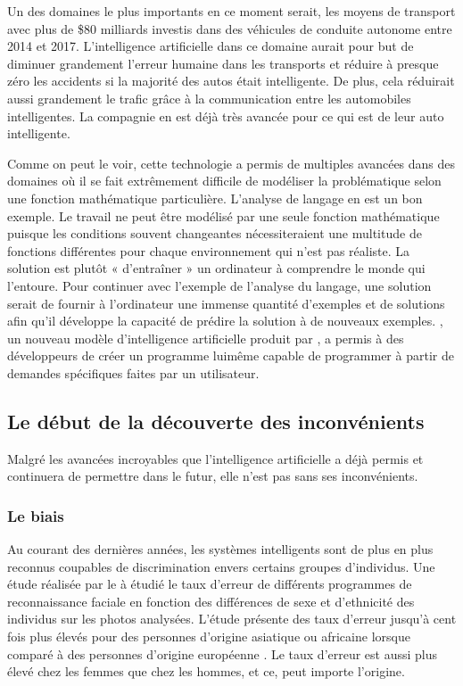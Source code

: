 \documentclass[letterpaper,10pt,french]{sphinxmanual}
\begin{document}
Un des domaines le plus importants en ce moment serait, les moyens de transport avec plus de \$80
milliards investis dans des véhicules de conduite autonome entre 2014 et 2017. L’intelligence
artificielle dans ce domaine aurait pour but de diminuer grandement l’erreur humaine dans les transports
et réduire à presque zéro les accidents si la majorité des autos était intelligente. De plus, cela réduirait
aussi grandement le trafic grâce à la communication entre les automobiles intelligentes. La compagnie 
en est déjà très avancée pour ce qui est de leur auto intelligente. 

Comme on peut le voir, cette technologie a permis de multiples avancées dans des domaines où
il se fait extrêmement difficile de modéliser la problématique selon une
fonction mathématique particulière. L’analyse de langage en est un bon exemple.
Le travail ne peut être modélisé par une seule fonction mathématique puisque
les conditions souvent changeantes nécessiteraient une multitude de fonctions
différentes pour chaque environnement qui n’est pas réaliste. La solution est
plutôt « d’entraîner » un ordinateur à comprendre le monde qui l’entoure.
Pour continuer avec l’exemple de l’analyse du langage, une solution serait
de fournir à l’ordinateur une immense quantité d’exemples et de solutions afin
qu’il développe la capacité de prédire la solution à de nouveaux exemples.
,
un nouveau modèle d’intelligence artificielle produit par
, a permis à des développeurs de créer un programme
lui\sphinxhyphen{}même capable de programmer à partir de demandes spécifiques faites par un
utilisateur.


\subsection{Le début de la découverte des inconvénients}
\label{\detokenize{intro_finale:le-debut-de-la-decouverte-des-inconvenients}}
Malgré les avancées incroyables que l’intelligence artificielle a déjà permis et
continuera de permettre dans le futur, elle n’est pas sans ses inconvénients.


\subsubsection{Le biais}
\label{\detokenize{intro_finale:le-biais}}
Au
courant des dernières années, les systèmes intelligents sont de plus en plus
reconnus coupables de discrimination envers certains groupes d’individus. Une
étude réalisée par le  à étudié le taux d’erreur de
différents programmes de reconnaissance faciale en fonction des différences de
sexe et d’ethnicité des individus sur les photos analysées. L’étude
présente des taux d’erreur
jusqu’à cent fois plus élevés pour des personnes d’origine asiatique ou
africaine lorsque comparé à des personnes d’origine européenne .
Le taux d’erreur est aussi plus élevé chez les femmes que chez les hommes, et
ce, peut importe l’origine.
\end{document}
